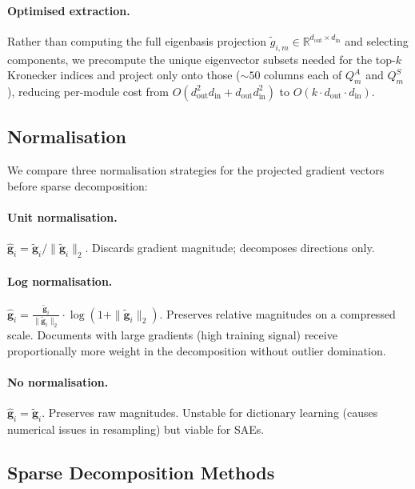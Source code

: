 \paragraph{Optimised extraction.} Rather than computing the full eigenbasis projection $\tilde{g}_{i,m} \in \mathbb{R}^{d_{\text{out}} \times d_{\text{in}}}$ and selecting components, we precompute the unique eigenvector subsets needed for the top-$k$ Kronecker indices and project only onto those (${\sim}50$ columns each of $Q_m^A$ and $Q_m^S$), reducing per-module cost from $O(d_{\text{out}}^2 d_{\text{in}} + d_{\text{out}} d_{\text{in}}^2)$ to $O(k \cdot d_{\text{out}} \cdot d_{\text{in}})$.

\subsection{Normalisation}

We compare three normalisation strategies for the projected gradient vectors before sparse decomposition:

\paragraph{Unit normalisation.} $\hat{\mathbf{g}}_i = \tilde{\mathbf{g}}_i / \|\tilde{\mathbf{g}}_i\|_2$. Discards gradient magnitude; decomposes directions only.

\paragraph{Log normalisation.} $\hat{\mathbf{g}}_i = \frac{\tilde{\mathbf{g}}_i}{\|\tilde{\mathbf{g}}_i\|_2} \cdot \log(1 + \|\tilde{\mathbf{g}}_i\|_2)$. Preserves relative magnitudes on a compressed scale. Documents with large gradients (high training signal) receive proportionally more weight in the decomposition without outlier domination.

\paragraph{No normalisation.} $\hat{\mathbf{g}}_i = \tilde{\mathbf{g}}_i$. Preserves raw magnitudes. Unstable for dictionary learning (causes numerical issues in resampling) but viable for SAEs.

\subsection{Sparse Decomposition Methods}

